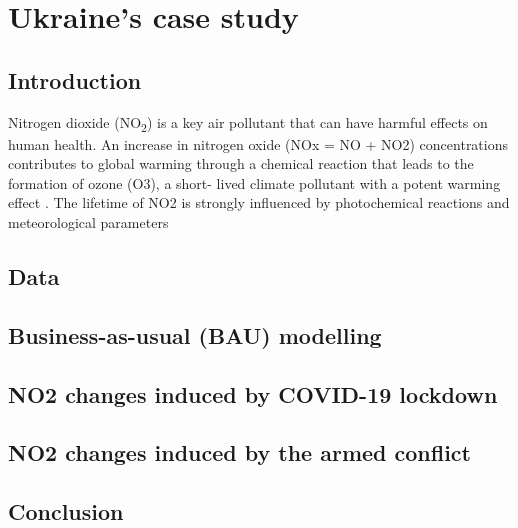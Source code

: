\chapter{Ukraine's case study}
\section{Introduction}
Nitrogen dioxide (NO\textsubscript{2}) is a key air pollutant that can have harmful effects on human health. An increase in nitrogen oxide (NOx = NO + NO2) concentrations contributes to global warming through a chemical reaction that leads to the formation of ozone (O3), a short- lived climate pollutant with a potent warming effect \citep{ipcc2013}. The lifetime of NO2 is strongly influenced by photochemical reactions and meteorological parameters 
\section{Data}
\section{Business-as-usual (BAU) modelling}
\section{NO2 changes induced by COVID-19 lockdown}
\section{NO2 changes induced by the armed conflict}
\section{Conclusion}